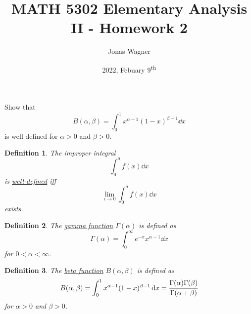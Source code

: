\documentclass[]{article}
\title{MATH 5302 Elementary Analysis II - Homework 2}
\author{Jonas Wagner}
\date{2022, Febuary 9\textsuperscript{th}}
\newcommand{\R}{\mathbb{R}}
\newtheorem{definition}{Definition}
\newtheorem{theorem}{Theorem}
\begin{document}
\maketitle

\section{}
Show that\[
    B(\alpha,\beta) = \int_0^1 x^{\alpha-1} (1-x)^{\beta-1} \dd{x}
\] is well-defined for $\alpha > 0$ and $\beta > 0$.

\begin{definition} \label{def:well_defined}
    The improper integral \[
        \int_{0}^{a} f(x) \dd{x}
    \] is \emph{\underline{well-defined}} iff\[
        \lim_{\epsilon \to 0} \int_{0}^{a} f(x) \dd{x}
    \] exists.
\end{definition}

\begin{definition} \label{def:gamma_fun}
    The \underline{\emph{gamma function}} $\Gamma(\alpha)$ is defined as \[
        \Gamma(\alpha) = \int_{0}^{\infty} e^{-x} x^{\alpha - 1} \dd{x}
    \] for $0 < \alpha < \infty$.
\end{definition}

\begin{definition} \label{def:beta_fun}
    The \underline{\emph{beta function}} $B(\alpha, \beta)$ is defined as \[
        B(\alpha,\beta) = \int_0^1 x^{\alpha-1} (1-x)^{\beta-1} \dd{x}
            = \cfrac{\Gamma(\alpha)\Gamma(\beta)}{\Gamma(\alpha + \beta)}
    \] for $\alpha>0$ and $\beta>0$.
\end{definition}


\end{document}
